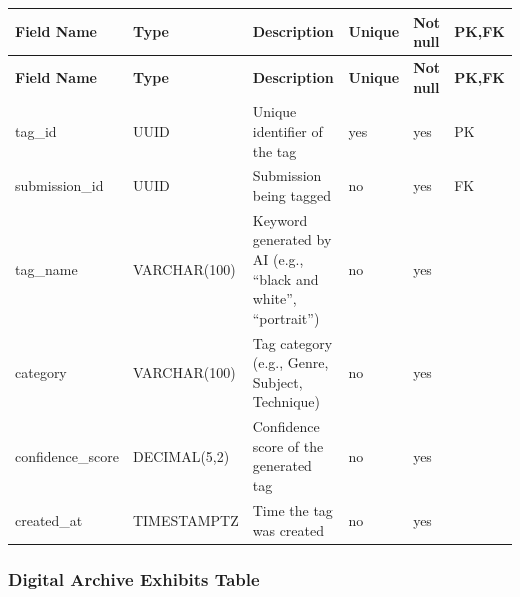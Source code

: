 \vspace{0.5em}
\renewcommand{\arraystretch}{1.15}
\setlength{\tabcolsep}{4pt}
\small
\begin{longtable}{|>{\raggedright\arraybackslash}p{}|>{\raggedright\arraybackslash}p{}|>{\raggedright\arraybackslash}p{}|>{\centering\arraybackslash}p{}|>{\centering\arraybackslash}p{}|>{\centering\arraybackslash}p{}|}
\hline
\textbf{Field Name} & \textbf{Type} & \textbf{Description} & \textbf{Unique} & \textbf{Not null} & \textbf{PK,FK} \\
\hline
\endfirsthead
\textbf{Field Name} & \textbf{Type} & \textbf{Description} & \textbf{Unique} & \textbf{Not null} & \textbf{PK,FK} \\
\hline
\endhead
tag\_id & UUID & Unique identifier of the tag & yes & yes & PK \\
\hline
submission\_id & UUID & Submission being tagged & no & yes & FK \\
\hline
tag\_name & VARCHAR(100) & Keyword generated by AI (e.g., ``black and white'', ``portrait'') & no & yes & \\
\hline
category & VARCHAR(100) & Tag category (e.g., Genre, Subject, Technique) & no & yes & \\
\hline
confidence\_score & DECIMAL(5,2) & Confidence score of the generated tag & no & yes & \\
\hline
created\_at & TIMESTAMPTZ & Time the tag was created & no & yes & \\
\hline
\end{longtable}

\vspace{1em}
\subsubsection{Digital Archive Exhibits Table}
\label{subsubsec:digital-archive-exhibits-table}

